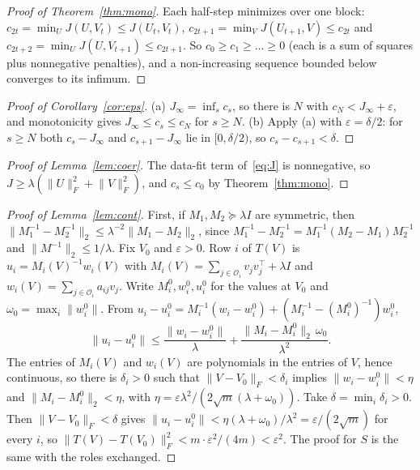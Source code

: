 \documentclass[10pt]{article}
\theoremstyle{plain}
\theoremstyle{definition}
\theoremstyle{remark}
\newcommand{\T}{^{\top}}
\newcommand{\opn}[1]{\lVert #1\rVert_2}
\newcommand{\fro}[1]{\lVert #1\rVert_F}
\newcommand{\norm}[1]{\lVert #1\rVert}
\newcommand{\obs}{\mathcal{O}}
\begin{document}
\begin{proof}[Proof of Theorem~\ref{thm:mono}]
Each half-step minimizes over one block: $c_{2t}=\min_UJ(U,V_t)\le J(U_t,V_t)$, $c_{2t+1}=\min_VJ(U_{t+1},V)\le c_{2t}$ and $c_{2t+2}=\min_UJ(U,V_{t+1})\le c_{2t+1}$. So $c_0\ge c_1\ge\dots\ge0$ (each is a sum of squares plus nonnegative penalties), and a non-increasing sequence bounded below converges to its infimum.
\end{proof}

\begin{proof}[Proof of Corollary~\ref{cor:eps}]
(a) $J_\infty=\inf_sc_s$, so there is $N$ with $c_N<J_\infty+\varepsilon$, and monotonicity gives $J_\infty\le c_s\le c_N$ for $s\ge N$.
(b) Apply (a) with $\varepsilon=\delta/2$: for $s\ge N$ both $c_s-J_\infty$ and $c_{s+1}-J_\infty$ lie in $[0,\delta/2)$, so $c_s-c_{s+1}<\delta$.
\end{proof}

\begin{proof}[Proof of Lemma~\ref{lem:coer}]
The data-fit term of~\eqref{eq:J} is nonnegative, so $J\ge\lambda(\fro U^2+\fro V^2)$, and $c_s\le c_0$ by Theorem~\ref{thm:mono}.
\end{proof}

\begin{proof}[Proof of Lemma~\ref{lem:cont}]
First, if $M_1,M_2\succeq\lambda I$ are symmetric, then $\opn{M_1^{-1}-M_2^{-1}}\le\lambda^{-2}\opn{M_1-M_2}$, since $M_1^{-1}-M_2^{-1}=M_1^{-1}(M_2-M_1)M_2^{-1}$ and $\opn{M^{-1}}\le1/\lambda$. Fix $V_0$ and $\varepsilon>0$. Row $i$ of $T(V)$ is $u_i=M_i(V)^{-1}w_i(V)$ with $M_i(V)=\sum_{j\in\obs_i}v_jv_j\T+\lambda I$ and $w_i(V)=\sum_{j\in\obs_i}a_{ij}v_j$. Write $M_i^0,w_i^0,u_i^0$ for the values at $V_0$ and $\omega_0=\max_i\norm{w_i^0}$. From $u_i-u_i^0=M_i^{-1}(w_i-w_i^0)+(M_i^{-1}-(M_i^0)^{-1})w_i^0$,
\[
\norm{u_i-u_i^0}\le\frac{\norm{w_i-w_i^0}}{\lambda}+\frac{\opn{M_i-M_i^0}\,\omega_0}{\lambda^2}.
\]
The entries of $M_i(V)$ and $w_i(V)$ are polynomials in the entries of $V$, hence continuous, so there is $\delta_i>0$ such that $\fro{V-V_0}<\delta_i$ implies $\norm{w_i-w_i^0}<\eta$ and $\opn{M_i-M_i^0}<\eta$, with $\eta=\varepsilon\lambda^2/(2\sqrt m(\lambda+\omega_0))$. Take $\delta=\min_i\delta_i>0$. Then $\fro{V-V_0}<\delta$ gives $\norm{u_i-u_i^0}<\eta(\lambda+\omega_0)/\lambda^2=\varepsilon/(2\sqrt m)$ for every $i$, so $\fro{T(V)-T(V_0)}^2<m\cdot\varepsilon^2/(4m)<\varepsilon^2$. The proof for $S$ is the same with the roles exchanged.
\end{proof}
\end{document}
